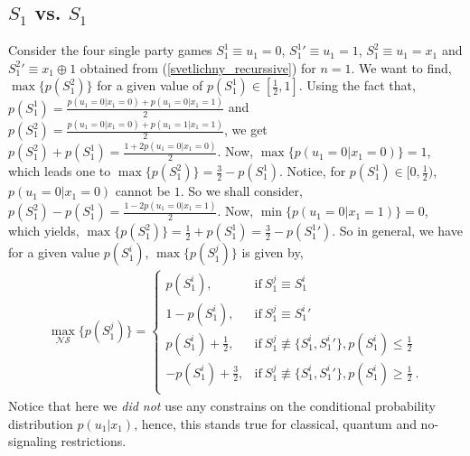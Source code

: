 \begin{widetext}
\begin{appendices}
\subsection*{$S_1$ vs. $S_1$}
Consider the four single party games $S_1^1\equiv u_1=0$, ${S_1^1}'\equiv u_1=1$, ${S_1^2}\equiv u_1=x_1$ and ${S_1^2}'\equiv x_1\oplus 1$  obtained from (\ref{svetlichny_recurssive}) for $n=1$. We want to find, $\max\{p(S_1^2)\}$ for a given value of $p({S_1^1}) \in [\frac{1}{2},1] $. Using the fact that, $p({S_1^1})=\frac{p(u_1=0|x_1=0)+p(u_1=0|x_1=1)}{2}$ and $p({S_1^2})=\frac{p(u_1=0|x_1=0)+p(u_1=1|x_1=1)}{2}$, we get $p({S_1^2}) + p({S_1^1}) = \frac{1+2p(u_1=0|x_1=0)}{2}$. Now, $\max\{p(u_1=0|x_1=0)\}=1$, which leads one to $\max\{p(S_1^2)\}=\frac{3}{2}-p({S_1^1})$. Notice, for $p({S_1^1})\in [0,\frac{1}{2})$, $p(u_1=0|x_1=0)$ cannot be $1$. So we shall consider, $p({S_1^2}) - p({S_1^1}) = \frac{1-2p(u_1=0|x_1=1)}{2}$. Now, $\min\{p(u_1=0|x_1=1)\}=0$, which yields, $\max\{p(S_1^2)\}=\frac{1}{2}+p({S_1^1})=\frac{3}{2}-p({S_1^1}')$.  
So in general, we have for a given value $p(S_1^i)$, $\max\{p(S_1^j)\}$ is given by,
\begin{eqnarray}
\label{marginal_game}
    \max_{\mathcal{NS}} \{ p({S_1^j}) \} =
    \begin{cases}
      p({S_1^i}), & \text{if}\ S_1^j \equiv S_1^i \\
      1 - p({S_1^i}), & \text{if}\ S_1^j \equiv {S_1^i}{'}   \\
      p({S_1^i})+\frac{1}{2}, &  \text{if} \ S_1^j \not \equiv \{{S_1^i},{S_1^i}{'}\},  p({S_1^i})\le \frac{1}{2} \\
      
      -p({S_1^i}) +\frac{3}{2}, & \text{if} \ S_1^j \not \equiv \{{S_1^i},{S_1^i}{'}\},  p({S_1^i}) \ge \frac{1}{2} \ . \\
     
    \end{cases} 
\end{eqnarray}
\noindent
Notice that here we \textit{did not} use any constrains on the conditional probability distribution $p(u_1|x_1)$, hence, this stands true for classical, quantum and no-signaling restrictions.\\

\end{appendices}
\end{widetext}
